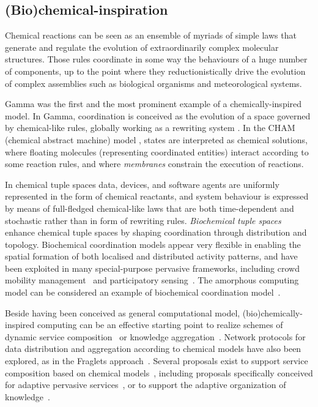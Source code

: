 \documentclass[12pt,a4paper,twoside,openright]{book}
\begin{document}
\subsection{(Bio)chemical-inspiration}

Chemical reactions can be seen as an ensemble of myriads of simple laws that generate and regulate the evolution of extraordinarily complex molecular structures.
%
Those rules coordinate in some way the behaviours of a huge number of components, up to the point where they reductionistically drive the evolution of complex assemblies such as biological organisms and meteorological systems.

Gamma \cite{gamma-scico15} was the first and the most prominent example of a chemically-inspired model.
%
In Gamma, coordination is conceived as the evolution of a space governed by chemical-like rules, globally working as a rewriting system \cite{gamma-lncs2235}.
%
In the CHAM (chemical abstract machine) model \cite{cham-tcs96}, states are interpreted as chemical solutions, where floating molecules (representing coordinated entities) interact according to some reaction rules, and where \emph{membranes} constrain the execution of reactions.

In chemical tuple spaces \cite{chemcoord-soarbook} data, devices, and software agents are uniformly represented in the form of chemical reactants, and system behaviour is expressed by means of full-fledged chemical-like laws that are both time-dependent and stochastic rather than in form of rewriting rules.
%
\emph{Biochemical tuple spaces}~\cite{VCMZ-TAAS2011} enhance chemical tuple spaces by shaping coordination through distribution and topology.
%
Biochemical coordination models appear very flexible in enabling the spatial formation of both localised and distributed activity patterns, and have been exploited in many special-purpose pervasive frameworks, including crowd mobility management~\cite{werfel} and participatory sensing~\cite{lee}. The amorphous computing model can be considered an example of biochemical coordination model~\cite{amorphous}.

Beside having been conceived as general computational model, (bio)chemically-inspired computing can be an effective starting point to realize schemes of dynamic service composition~\cite{frei} or knowledge aggregation~\cite{mariani2013molecules}.
%
Network protocols for data distribution and aggregation according to chemical models have also been explored, as in the Fraglets approach~\cite{Meyer07,Monti13}.
%
Several proposals exist to support service composition based on chemical models~\cite{BanP09}, including proposals specifically conceived for adaptive pervasive services~\cite{cpe}, or to support the adaptive organization of knowledge~\cite{mariani2013molecules}.
\end{document}
